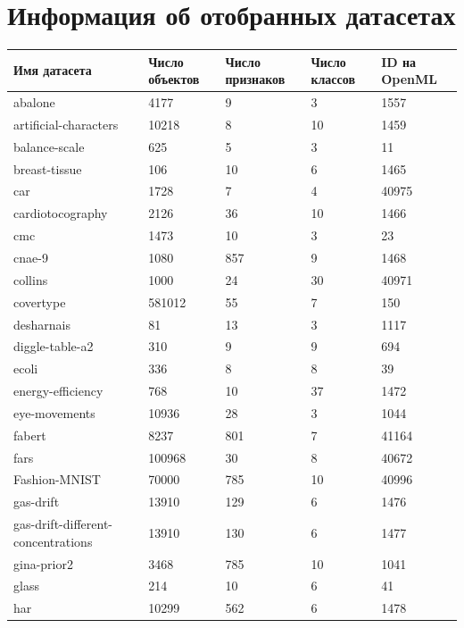 \documentclass[times,specification,annotation]{itmo-student-thesis}
\begin{document}
	\chapter{Информация об отобранных датасетах}\label{app:dataset-info}
	\begin{center}
		\begin{longtable}{ |m{5cm}|m{2.5cm}|m{2.5cm}|m{2cm}|m{2cm}| } 
			\hline
			\textbf{Имя датасета} & \textbf{Число объектов} & \textbf{Число признаков} & \textbf{Число классов} & \textbf{ID на OpenML} \\
			\hline\hline
			abalone & 4177 & 9 & 3 & 1557 \\
			\hline
			artificial-characters & 10218 & 8 & 10 & 1459 \\
			\hline
			balance-scale & 625 & 5 & 3 & 11 \\
			\hline
			breast-tissue & 106 & 10 & 6 & 1465 \\
			\hline
			car & 1728 & 7 & 4 & 40975 \\
			\hline
			cardiotocography & 2126 & 36 & 10 & 1466 \\
			\hline
			cmc & 1473 & 10 & 3 & 23 \\
			\hline
			cnae-9 & 1080 & 857 & 9 & 1468 \\
			\hline
			collins & 1000 & 24 & 30 & 40971 \\
			\hline
			covertype & 581012 & 55 & 7 & 150 \\
			\hline
			desharnais & 81 & 13 & 3 & 1117 \\
			\hline
			diggle-table-a2 & 310 & 9 & 9 & 694 \\
			\hline
			ecoli & 336 & 8 & 8 & 39 \\
			\hline
			energy-efficiency & 768 & 10 & 37 & 1472 \\
			\hline
			eye-movements & 10936 & 28 & 3 & 1044 \\
			\hline
			fabert & 8237 & 801 & 7 & 41164 \\
			\hline
			fars & 100968 & 30 & 8 & 40672 \\
			\hline
			Fashion-MNIST & 70000 & 785 & 10 & 40996 \\
			\hline
			gas-drift & 13910 & 129 & 6 & 1476 \\
			\hline
			gas-drift-different-concentrations & 13910 & 130 & 6 & 1477 \\
			\hline
			gina-prior2 & 3468 & 785 & 10 & 1041 \\
			\hline
			glass & 214 & 10 & 6 & 41 \\
			\hline
			har & 10299 & 562 & 6 & 1478 \\

\end{longtable}
\end{center}
\end{document}
